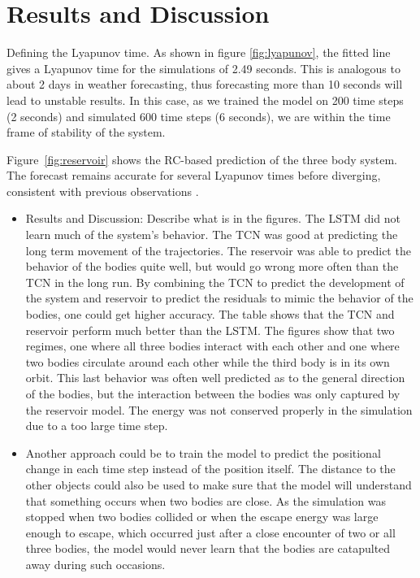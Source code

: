 \documentclass[%
 reprint,
 amsmath,amssymb,
 aps,
]{revtex4-2}
\begin{document}





\section{\label{sec:results}Results and Discussion} %

Defining the Lyapunov time. As shown in figure \ref{fig:lyapunov}, the fitted line gives a Lyapunov time for the simulations of 2.49 seconds. This is analogous to about 2 days in weather forecasting, thus forecasting more than 10 seconds will lead to unstable results. In this case, as we trained the model on 200 time steps (2 seconds) and simulated 600 time steps (6 seconds), we are within the time frame of stability of the system.

Figure~\ref{fig:reservoir} shows the RC-based prediction of the three body system. The forecast remains accurate for several Lyapunov times before diverging, consistent with previous observations \cite{pathak2018model}.

\begin{itemize}
    \item Results and Discussion: Describe what is in the figures. The LSTM did not learn much of the system's behavior. The TCN was good at predicting the long term movement of the trajectories. The reservoir was able to predict the behavior of the bodies quite well, but would go wrong more often than the TCN in the long run. By combining the TCN to predict the development of the system and reservoir to predict the residuals to mimic the behavior of the bodies, one could get higher accuracy. The table shows that the TCN and reservoir perform much better than the LSTM. The figures show that two regimes, one where all three bodies interact with each other and one where two bodies circulate around each other while the third body is in its own orbit. This last behavior was often well predicted as to the general direction of the bodies, but the interaction between the bodies was only captured by the reservoir model. The energy was not conserved properly in the simulation due to a too large time step.
    \item Another approach could be to train the model to predict the positional change in each time step instead of the position itself. The distance to the other objects could also be used to make sure that the model will understand that something occurs when two bodies are close. As the simulation was stopped when two bodies collided or when the escape energy was large enough to escape, which occurred just after a close encounter of two or all three bodies, the model would never learn that the bodies are catapulted away during such occasions.
\end{itemize}
\end{document}
